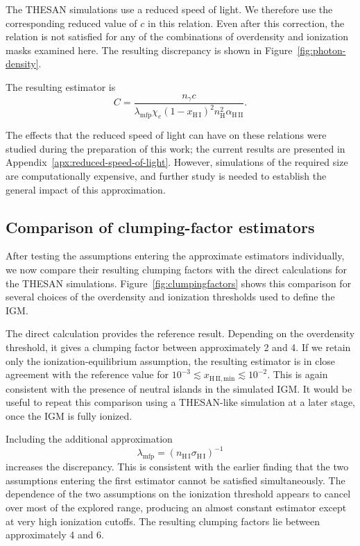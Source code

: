 \documentclass[%
 reprint,
nofootinbib,
 amsmath,amssymb,
 aps,
]{revtex4-2}
\begin{document}
The THESAN simulations use a reduced speed of light. We therefore use the corresponding reduced value of $c$ in this relation. Even after this correction, the relation is not satisfied for any of the combinations of overdensity and ionization masks examined here. The resulting discrepancy is shown in Figure~\ref{fig:photon-density}.

The resulting estimator is
\begin{equation}
C = \frac{n_{\gamma}c}
{\lambda_{\mathrm{mfp}}\chi_e\left(1-x_{\mathrm{H\,I}}\right)^2
n_{\mathrm{H}}^2\alpha_{\mathrm{H\,II}}}.
\end{equation}

The effects that the reduced speed of light can have on these relations were studied during the preparation of this work; the current results are presented in Appendix~\ref{apx:reduced-speed-of-light}. However, simulations of the required size are computationally expensive, and further study is needed to establish the general impact of this approximation.

\subsection{Comparison of clumping-factor estimators}

After testing the assumptions entering the approximate estimators individually, we now compare their resulting clumping factors with the direct calculations for the THESAN simulations. Figure~\ref{fig:clumpingfactors} shows this comparison for several choices of the overdensity and ionization thresholds used to define the IGM.

The direct calculation provides the reference result. Depending on the overdensity threshold, it gives a clumping factor between approximately 2 and 4. If we retain only the ionization-equilibrium assumption, the resulting estimator is in close agreement with the reference value for $10^{-3}\lesssim x_{\mathrm{H\,II,min}}\lesssim10^{-2}$. This is again consistent with the presence of neutral islands in the simulated IGM. It would be useful to repeat this comparison using a THESAN-like simulation at a later stage, once the IGM is fully ionized.

Including the additional approximation
\begin{equation}
\lambda_{\mathrm{mfp}}=
\left(n_{\mathrm{H\,I}}\sigma_{\mathrm{H\,I}}\right)^{-1}
\end{equation}
increases the discrepancy. This is consistent with the earlier finding that the two assumptions entering the first estimator cannot be satisfied simultaneously. The dependence of the two assumptions on the ionization threshold appears to cancel over most of the explored range, producing an almost constant estimator except at very high ionization cutoffs. The resulting clumping factors lie between approximately 4 and 6.
\end{document}
